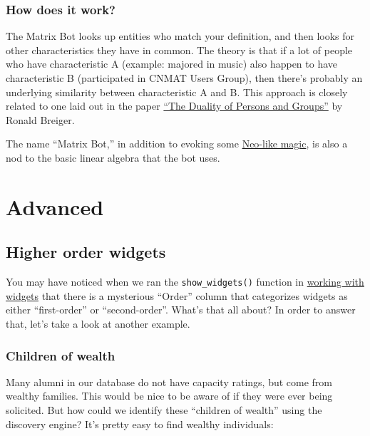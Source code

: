 \documentclass[]{book}
\begin{document}
\hypertarget{how-does-it-work}{%
\section{How does it work?}\label{how-does-it-work}}

The Matrix Bot looks up entities who match your definition, and then looks for other characteristics they have in common. The theory is that if a lot of people who have characteristic A (example: majored in music) also happen to have characteristic B (participated in CNMAT Users Group), then there's probably an underlying similarity between characteristic A and B. This approach is closely related to one laid out in the paper \href{http://www.rci.rutgers.edu/~pmclean/mcleanp_01_920_313_breiger_duality.pdf}{``The Duality of Persons and Groups''} by Ronald Breiger.

The name ``Matrix Bot,'' in addition to evoking some \href{https://en.wikipedia.org/wiki/The_Matrix}{Neo-like magic}, is also a nod to the basic linear algebra that the bot uses.

\hypertarget{part-advanced}{%
\part{Advanced}\label{part-advanced}}

\hypertarget{higher-order-widgets}{%
\chapter{Higher order widgets}\label{higher-order-widgets}}

You may have noticed when we ran the \texttt{show\_widgets()} function in \protect\hyperlink{working-with-finding-widgets}{working with widgets} that there is a mysterious ``Order'' column that categorizes widgets as either ``first-order'' or ``second-order''. What's that all about? In order to answer that, let's take a look at another example.

\hypertarget{children-of-wealth}{%
\section{Children of wealth}\label{children-of-wealth}}

Many alumni in our database do not have capacity ratings, but come from wealthy families. This would be nice to be aware of if they were ever being solicited. But how could we identify these ``children of wealth'' using the discovery engine? It's pretty easy to find wealthy individuals:
\end{document}
